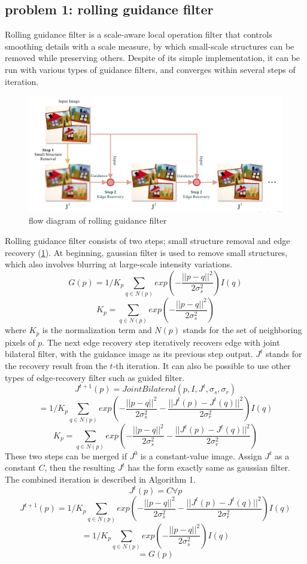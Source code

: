 \documentclass[extendedabs]{bmvc2k}
\begin{document}
\subsection*{problem 1: rolling guidance filter}

Rolling guidance filter \cite{rolling} is a scale-aware local operation filter that controls smoothing
details with a scale measure, by which small-scale structures can be removed while preserving others.
Despite of its simple implementation, it can be run with various types of guidance filters, and 
converges within several steps of iteration.

\begin{figure}[h]
    \centering
    \includegraphics[width=\linewidth]{hw2_1_6}
    \caption{flow diagram of rolling guidance filter}
    \label{fig:6}
\end{figure}

Rolling guidance filter consists of two steps; small structure removal and 
edge recovery (\figurename{\ref{fig:6}}).
At beginning, gaussian filter is used to remove small structures, which also involves blurring at
large-scale intensity variations.
\[G(p) = 1/K_p\sum_{q \in N(p)}exp(-\frac{||p-q||^2}{2\sigma_s^2})I(q)\]
\[K_p = \sum_{q \in N(p)}exp(-\frac{||p-q||^2}{2\sigma_s^2})\]
where $K_p$ is the normalization term and $N(p)$ stands for the set of neighboring pixels of $p$.
The next edge recovery step iteratively recovers edge with joint bilateral filter, with the guidance
image as its previous step output. $J^t$ stands for the recovery result from the $t$-th iteration.
It can also be possible to use other types of edge-recovery filter such as guided filter.
\[J^{t+1}(p) = JointBilateral(p, I, J^t, \sigma_s, \sigma_r)\]
\[= 1/K_p\sum_{q \in N(p)}exp(-\frac{||p-q||^2}{2\sigma_s^2}-\frac{||J^t(p)-J^t(q)||^2}{2\sigma_r^2})I(q)\]
\[K_p = \sum_{q \in N(p)}exp(-\frac{||p-q||^2}{2\sigma_s^2}-\frac{||J^t(p)-J^t(q)||^2}{2\sigma_r^2})\]
These two steps can be merged if $J^0$ is a constant-value image. Assign $J^t$ as a constant $C$, then
the resulting $J^t$ has the form exactly same as gaussian filter. The combined iteration is described in Algorithm 1.
\[J^t(p) = C \forall p\]
\[J^{t+1}(p) = 1/K_p\sum_{q \in N(p)}exp(-\frac{||p-q||^2}{2\sigma_s^2}-\frac{||J^t(p)-J^t(q)||^2}{2\sigma_r^2})I(q)\]
\[= 1/K_p\sum_{q \in N(p)}exp(-\frac{||p-q||^2}{2\sigma_s^2})I(q)\]
\[= G(p)\]
\end{document}
